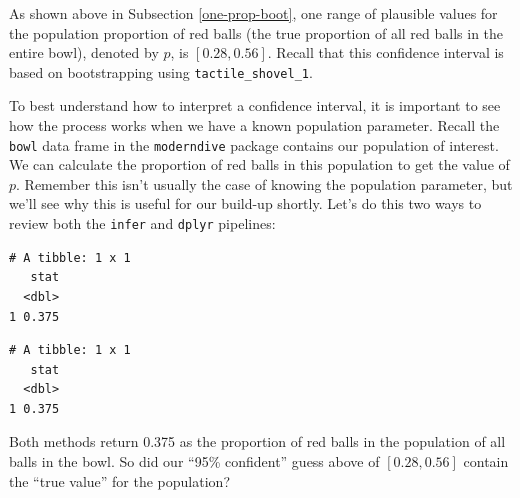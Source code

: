 \documentclass[12pt, krantz2,]{krantz}
\makeatletter
\newenvironment{Shaded}{\begin{snugshade}}{\end{snugshade}}
\newcommand{\DataTypeTok}[1]{\textcolor[rgb]{0.27,0.27,0.27}{#1}}
\newcommand{\KeywordTok}[1]{\textcolor[rgb]{0.27,0.27,0.27}{\textbf{#1}}}
\newcommand{\NormalTok}[1]{#1}
\newcommand{\OperatorTok}[1]{\textcolor[rgb]{0.43,0.43,0.43}{\textbf{#1}}}
\newcommand{\OtherTok}[1]{\textcolor[rgb]{0.37,0.37,0.37}{#1}}
\newcommand{\StringTok}[1]{\textcolor[rgb]{0.5,0.5,0.5}{#1}}
\newenvironment{kframe}{%
\medskip{}
\setlength{\fboxsep}{.8em}
 \def\at@end@of@kframe{}%
 \ifinner\ifhmode%
  \def\at@end@of@kframe{\end{minipage}}%
  \begin{minipage}{\columnwidth}%
 \fi\fi%
 \def\FrameCommand##1{\hskip\@totalleftmargin \hskip-\fboxsep
 \colorbox{shadecolor}{##1}\hskip-\fboxsep
     \hskip-\linewidth \hskip-\@totalleftmargin \hskip\columnwidth}%
 \MakeFramed {\advance\hsize-\width
   \@totalleftmargin\z@ \linewidth\hsize
   \@setminipage}}%
 {\par\unskip\endMakeFramed%
 \at@end@of@kframe}
\renewenvironment{Shaded}{\begin{kframe}}{\end{kframe}}
\makeatother
\begin{document}
As shown above in Subsection \ref{one-prop-boot}, one range of plausible values for the population proportion of red balls (the true proportion of all red balls in the entire bowl), denoted by \(p\), is \([0.28, 0.56]\). Recall that this confidence interval is based on bootstrapping using \texttt{tactile\_shovel\_1}.

To best understand how to interpret a confidence interval, it is important to see how the process works when we have a known population parameter. Recall the \texttt{bowl} data frame in the \texttt{moderndive} package contains our population of interest. We can calculate the proportion of red balls in this population to get the value of \(p\). Remember this isn't usually the case of knowing the population parameter, but we'll see why this is useful for our build-up shortly. Let's do this two ways to review both the \texttt{infer} and \texttt{dplyr} pipelines:

\begin{Shaded}
\end{Shaded}

\begin{verbatim}
# A tibble: 1 x 1
   stat
  <dbl>
1 0.375
\end{verbatim}

\begin{Shaded}
\end{Shaded}

\begin{verbatim}
# A tibble: 1 x 1
   stat
  <dbl>
1 0.375
\end{verbatim}

Both methods return 0.375 as the proportion of red balls in the population of all balls in the bowl. So did our ``95\% confident'' guess above of \([0.28, 0.56]\) contain the ``true value'' for the population?
\end{document}
